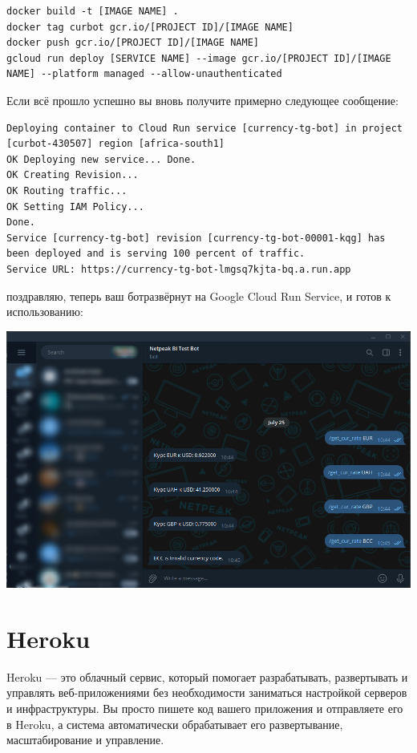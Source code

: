 \documentclass[
]{book}
\begin{document}
\begin{verbatim}
docker build -t [IMAGE NAME] .
docker tag curbot gcr.io/[PROJECT ID]/[IMAGE NAME]
docker push gcr.io/[PROJECT ID]/[IMAGE NAME]
gcloud run deploy [SERVICE NAME] --image gcr.io/[PROJECT ID]/[IMAGE NAME] --platform managed --allow-unauthenticated
\end{verbatim}

Если всё прошло успешно вы вновь получите примерно следующее сообщение:

\begin{verbatim}
Deploying container to Cloud Run service [currency-tg-bot] in project [curbot-430507] region [africa-south1]
OK Deploying new service... Done.
OK Creating Revision...
OK Routing traffic...
OK Setting IAM Policy...
Done.
Service [currency-tg-bot] revision [currency-tg-bot-00001-kqg] has been deployed and is serving 100 percent of traffic.
Service URL: https://currency-tg-bot-lmgsq7kjta-bq.a.run.app
\end{verbatim}

поздравляю, теперь ваш ботразвёрнут на Google Cloud Run Service, и готов к использованию:

\includegraphics{img/9-9.png}

\section{Heroku}\label{heroku}

Heroku --- это облачный сервис, который помогает разрабатывать, развертывать и управлять веб-приложениями без необходимости заниматься настройкой серверов и инфраструктуры. Вы просто пишете код вашего приложения и отправляете его в Heroku, а система автоматически обрабатывает его развертывание, масштабирование и управление.
\end{document}
